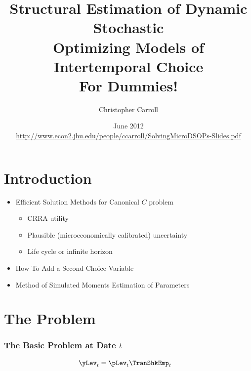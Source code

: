 \documentclass{beamer}
\begin{document}
\title[SolvingMicroDSOPs]{\textbf{Structural Estimation of Dynamic Stochastic\\ Optimizing Models of Intertemporal Choice \\ \LARGE{For Dummies!}}}
\author[Carroll]{Christopher Carroll}

\date{June 2012 \\ {\tiny \url{http://www.econ2.jhu.edu/people/ccarroll/SolvingMicroDSOPs-Slides.pdf}}
}


\begin{frame}[plain]
  \titlepage
\end{frame}

\section{Introduction}

\begin{frame}
\begin{itemize}
\item Efficient Solution Methods for Canonical $C$ problem
\begin{itemize}
\item CRRA utility
\item Plausible (microeconomically calibrated) uncertainty
\item Life cycle or infinite horizon
\end{itemize}
\item How To Add a Second Choice Variable
\item Method of Simulated Moments Estimation of Parameters
\end{itemize}
\end{frame}

\section{The Problem}

\begin{frame}[label=MaxProb]
\frametitle{\large\textbf{The Basic Problem at Date $t$}}


\begin{equation}\begin{gathered}\begin{aligned}
{\yLev}_{t}  & = {\pLev}_{t}\TranShkEmp_{t}
\end{aligned}\end{gathered}\end{equation}

\end{frame}
\end{document}
